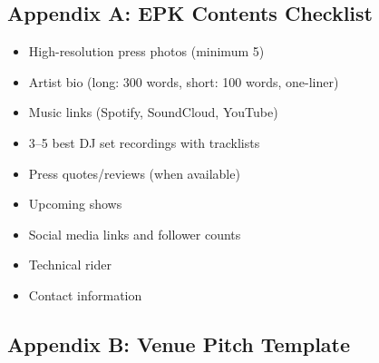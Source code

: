 \documentclass[11pt,a4paper]{article}
\begin{document}
\subsection{Appendix A: EPK Contents Checklist}

\begin{itemize}[leftmargin=*]
    \item[$\square$] High-resolution press photos (minimum 5)
    \item[$\square$] Artist bio (long: 300 words, short: 100 words, one-liner)
    \item[$\square$] Music links (Spotify, SoundCloud, YouTube)
    \item[$\square$] 3--5 best DJ set recordings with tracklists
    \item[$\square$] Press quotes/reviews (when available)
    \item[$\square$] Upcoming shows
    \item[$\square$] Social media links and follower counts
    \item[$\square$] Technical rider
    \item[$\square$] Contact information
\end{itemize}

\subsection{Appendix B: Venue Pitch Template}
\end{document}
